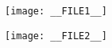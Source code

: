 \documentclass{article} %
\begin{document}
\begin{figure}
    \begin{minipage}{.5\textwidth}
        \texttt{[image: \_\_FILE1\_\_]}
    \end{minipage}%
    \begin{minipage}{.5\textwidth}
        \texttt{[image: \_\_FILE2\_\_]}
    \end{minipage}
\end{figure}
\end{document}
